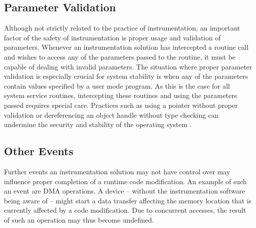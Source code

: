 \subsection{Parameter Validation}
Although not strictly related to the practice of instrumentation, an important factor
of the safety of instrumentation is proper usage and validation of parameters. Whenever
an instrumentation solution has intercepted a routine call and wishes to access any
of the parameters passed to the routine, it must be capable of dealing with invalid
parameters. The situation where proper parameter validation is especially crucial
for system stability is when any of the parameters contain values specified by a user
mode program. As this is the case for all system service routines, intercepting these
routines and using the parameters passed requires special care. Practices such
as using a pointer without proper validation or dereferencing an object handle without
type checking can undermine the security and stability of the operating system 
\cite{Skywing06}.

\subsection{Other Events}
Further events an instrumentation solution may not have control over may influence 
proper completion of a runtime code modification. An example of such an event are
DMA operations. A device -- without the instrumentation software being aware of --
might start a data transfer affecting the memory location that is currently affected
by a code modification. Due to concurrent accesses, the result of such an operation may
thus become undefined.

